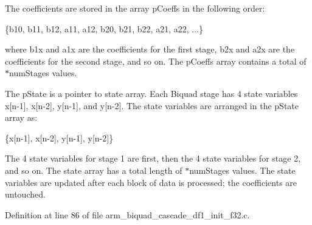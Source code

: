 \begin{DoxyParagraph}{}
The coefficients are stored in the array {\ttfamily p\-Coeffs} in the following order\-: 
\begin{DoxyPre}    
    \{b10, b11, b12, a11, a12, b20, b21, b22, a21, a22, ...\}    
\end{DoxyPre}

\end{DoxyParagraph}
\begin{DoxyParagraph}{}
where {\ttfamily b1x} and {\ttfamily a1x} are the coefficients for the first stage, {\ttfamily b2x} and {\ttfamily a2x} are the coefficients for the second stage, and so on. The {\ttfamily p\-Coeffs} array contains a total of {$\ast$num\-Stages} values.
\end{DoxyParagraph}
\begin{DoxyParagraph}{}
The {\ttfamily p\-State} is a pointer to state array. Each Biquad stage has 4 state variables {\ttfamily x\mbox{[}n-\/1\mbox{]}, x\mbox{[}n-\/2\mbox{]}, y\mbox{[}n-\/1\mbox{]},} and {\ttfamily y\mbox{[}n-\/2\mbox{]}}. The state variables are arranged in the {\ttfamily p\-State} array as\-: 
\begin{DoxyPre}    
    \{x[n-1], x[n-2], y[n-1], y[n-2]\}    
\end{DoxyPre}
 The 4 state variables for stage 1 are first, then the 4 state variables for stage 2, and so on. The state array has a total length of {$\ast$num\-Stages} values. The state variables are updated after each block of data is processed; the coefficients are untouched. 
\end{DoxyParagraph}


Definition at line 86 of file arm\-\_\-biquad\-\_\-cascade\-\_\-df1\-\_\-init\-\_\-f32.\-c.


